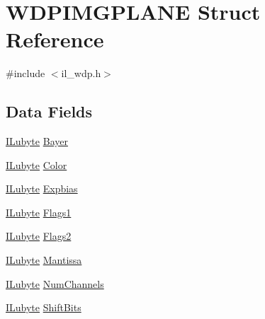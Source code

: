 \hypertarget{struct_w_d_p_i_m_g_p_l_a_n_e}{\section{W\-D\-P\-I\-M\-G\-P\-L\-A\-N\-E Struct Reference}
\label{struct_w_d_p_i_m_g_p_l_a_n_e}
}


{\ttfamily \#include $<$il\-\_\-wdp.\-h$>$}

\subsection*{Data Fields}
\begin{DoxyCompactItemize}
\item 
\hyperlink{il_8h_a8d2f04500100a86d1b00e98ab1b15a33}{I\-Lubyte} \hyperlink{struct_w_d_p_i_m_g_p_l_a_n_e_a2e7ea34b356f95568315af08bdc87adc}{Bayer}
\item 
\hyperlink{il_8h_a8d2f04500100a86d1b00e98ab1b15a33}{I\-Lubyte} \hyperlink{struct_w_d_p_i_m_g_p_l_a_n_e_a5ea9facfe3b6239994990cc91a882615}{Color}
\item 
\hyperlink{il_8h_a8d2f04500100a86d1b00e98ab1b15a33}{I\-Lubyte} \hyperlink{struct_w_d_p_i_m_g_p_l_a_n_e_a245313b693549d4b4ae5e163e542fb08}{Expbias}
\item 
\hyperlink{il_8h_a8d2f04500100a86d1b00e98ab1b15a33}{I\-Lubyte} \hyperlink{struct_w_d_p_i_m_g_p_l_a_n_e_a07ba0e8a0cba83c4c83923773ff63b67}{Flags1}
\item 
\hyperlink{il_8h_a8d2f04500100a86d1b00e98ab1b15a33}{I\-Lubyte} \hyperlink{struct_w_d_p_i_m_g_p_l_a_n_e_a484d8f0a3238c184ea631e08429e0325}{Flags2}
\item 
\hyperlink{il_8h_a8d2f04500100a86d1b00e98ab1b15a33}{I\-Lubyte} \hyperlink{struct_w_d_p_i_m_g_p_l_a_n_e_aec7df74767551b66f68538dd6ee027eb}{Mantissa}
\item 
\hyperlink{il_8h_a8d2f04500100a86d1b00e98ab1b15a33}{I\-Lubyte} \hyperlink{struct_w_d_p_i_m_g_p_l_a_n_e_a2e7a9368a1e84df6843b1da996d99fb6}{Num\-Channels}
\item 
\hyperlink{il_8h_a8d2f04500100a86d1b00e98ab1b15a33}{I\-Lubyte} \hyperlink{struct_w_d_p_i_m_g_p_l_a_n_e_a8e627de982c32ddf98ba78da2b3b0f9e}{Shift\-Bits}
\end{DoxyCompactItemize}


